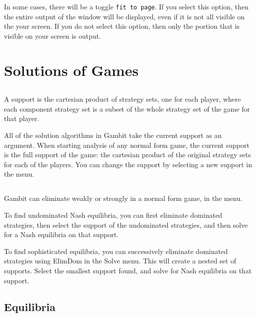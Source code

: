 In some cases, there will be a toggle \verb+fit to page+.  If you select 
this option, then the entire output of the window 
will be displayed, even if it is not all 
visible on the your screen.  If you do not select this option, then only 
the portion that is visible on your screen is output.  

\chapter{Solutions of Games}

\section{}\label{supportsec}

A support is the cartesian product of strategy sets, one for each player, 
where  each component strategy set is a subset of the whole strategy 
set of the game for that player.  

All of the solution algorithms in Gambit take the current support as an 
argument.  When starting analysis of any normal form game,  the current 
support is the full support of the game:  the cartesian product of the original 
strategy sets for each of the players.  You can change the support by 
selecting a new support in the  menu.  

\section{}\label{domsec}

Gambit can eliminate weakly or strongly 
 in a 
normal form game, in the  menu.  

To find undominated Nash equilibria, you can first eliminate dominated 
strategies, then select the support of the undominated strategies, and then 
solve for a Nash equilibria on that support.  

To find sophisticated equilibria, you can successively eliminate 
dominated strategies using ElimDom in the Solve menu.  This will 
create a nested set of supports.  
Select the smallest support found, and solve for Nash equilibria on that 
support.  

\section{Equilibria}

